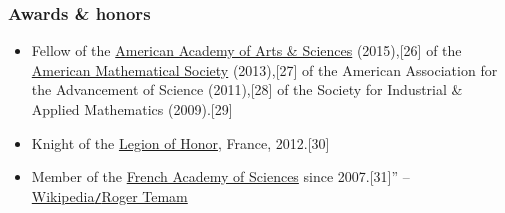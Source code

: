 \documentclass{article}
\begin{document}
\subsubsection{Awards \& honors}
\begin{itemize}
	\item Fellow of the \href{https://en.wikipedia.org/wiki/American_Academy_of_Arts_and_Sciences}{American Academy of Arts \& Sciences} (2015),[26] of the \href{https://en.wikipedia.org/wiki/American_Mathematical_Society}{American Mathematical Society} (2013),[27] of the American Association for the Advancement of Science (2011),[28] of the Society for Industrial \& Applied Mathematics (2009).[29]
	\item Knight of the \href{https://en.wikipedia.org/wiki/Legion_of_Honour}{Legion of Honor}, France, 2012.[30]
	\item Member of the \href{https://en.wikipedia.org/wiki/French_Academy_of_Sciences}{French Academy of Sciences} since 2007.[31]'' -- \href{https://en.wikipedia.org/wiki/Roger_Temam}{Wikipedia{\tt/}Roger Temam}
\end{itemize}

\end{document}

